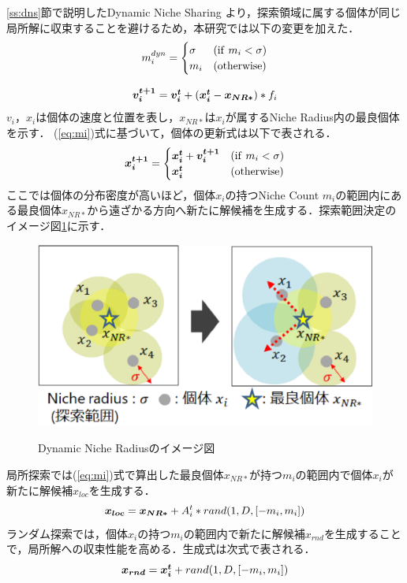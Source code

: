 \documentclass[a4j,11pt]{jarticle}
\begin{document}
\ref{ss:dns}節で説明したDynamic Niche Sharing \cite{DNS} より，探索領域に属する個体が同じ局所解に収束することを避けるため，本研究では以下の変更を加えた．
\begin{equation}
\label{eq:mi}
m_i^{dyn}=\begin{cases}
\sigma & ({\rm if } \ m_i < \sigma) \\
m_i & ({\rm otherwise})
\end{cases}
\end{equation}

\begin{equation}
\label{eq:dnrba-vi}
 \mbox{\boldmath $v_i^{t+1}$} = \mbox{\boldmath $v_i^t$} + (\mbox{\boldmath $x_i^t$}-\mbox{\boldmath $x_{NR*}$})*f_i
\end{equation}
$v_i$，$x_i$は個体の速度と位置を表し，$x_{NR*}$は$x_i$が属するNiche Radius内の最良個体を示す．
(\ref{eq:mi})式に基づいて，個体の更新式は以下で表される．
\begin{equation}
\label{eq:dnrba-xi}
\mbox{\boldmath $x_i^{t+1}$}=\begin{cases}
\mbox{\boldmath $x_i^t$}+\mbox{\boldmath $v_i^{t+1}$} & ({\rm if} \ m_i < \sigma) \\
\mbox{\boldmath $x_i^t$} & ({\rm otherwise})
\end{cases}
\end{equation}
ここでは個体の分布密度が高いほど，個体$x_i$の持つNiche Count $m_i$の範囲内にある最良個体$x_{NR*}$から遠ざかる方向へ新たに解候補を生成する．探索範囲決定のイメージ図\ref{fig:dnr}に示す．

\begin{figure}[h]
\centering
\includegraphics[width=0.7\linewidth]{eps/dynamic_niche_radius.eps}
\label{fig:dnr}
\caption{Dynamic Niche Radiusのイメージ図}
\end{figure}

局所探索では(\ref{eq:mi})式で算出した最良個体$x_{NR*}$が持つ$m_i$の範囲内で個体$x_i$が新たに解候補$x_{loc}$を生成する．
\begin{equation}
\label{eq:dnrloc}
\mbox{\boldmath $x_{loc}$}=\mbox{\boldmath $x_{NR*}$} + A_i^t*rand(1,D,[-m_i, m_i])
\end{equation}
ランダム探索では，個体$x_i$の持つ$m_i$の範囲内で新たに解候補$x_{rnd}$を生成することで，局所解への収束性能を高める．生成式は次式で表される．
\begin{equation}
\label{eq:dnrrnd}
\mbox{\boldmath $x_{rnd}$}=\mbox{\boldmath $x_i^t$} + rand(1,D,[-m_i, m_i])
\end{equation}
\end{document}
